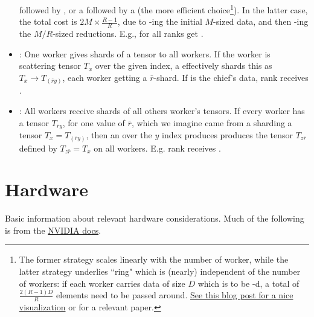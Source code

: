 \documentclass[11pt]{article}
\begin{document}
\begin{itemize}
	       followed by , or a  followed
	      by a  (the more efficient choice\footnote{The former strategy scales
		      linearly with the number of worker, while the latter strategy underlies ``ring"
		       which is (nearly) independent of the number of workers: if each
		      worker carries data of size $ D $ which is to be -d, a total of $
			      \frac{ 2 \left ( R-1 \right )D }{ R } $ elements need to be passed around.
		      \href{https://andrew.gibiansky.com/blog/machine-learning/baidu-allreduce/}{See this blog
			      post for a nice visualization} or \cite{bandwidthOptimalAllReduce2009} for a relevant
              paper.\label{foot_all_reduce}}). In the latter case, the total cost is $ 2M \times
              \frac{ R-1 }{ R } $, due to -ing the initial $ M $-sized data, and
              then -ing the $ M/R $-sized reductions. E.g., for 
              all ranks get .
      \item  {}: One worker gives shards of a tensor to all workers. If the worker
          is scattering tensor $ T _{ x } $ over the given index, a 
          effectively shards this as $ T _{ x } \longrightarrow T _{ (\bar{r}y) } $, each worker
          getting a $ \bar{r} $-shard. If  is the chief's data, rank 
          receives .
      \item  {}: All workers receive shards of all others worker's tensors.  If
          every worker has a tensor $ T _{ \bar{r}y } $, for one value of $ \bar{r} $, which we
          imagine came from a sharding a tensor $ T _{ x } = T _{ (\bar{r}y) } $, then an
           over the $ y $ index produces produces the tensor $ T _{ z \bar{r} }$
          defined by $T _{ z \bar{r} }= T _{ x } $ on all workers. E.g. rank  receives
          .
\end{itemize}



\section{Hardware}

Basic information about relevant hardware considerations. Much of the following is from the
\href{https://docs.nvidia.com/deeplearning/performance/dl-performance-gpu-background/index.html}{NVIDIA
	docs}.
\end{document}
